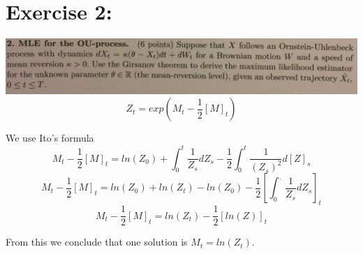 \documentclass[document.tex]{subfiles}
\begin{document}
\section*{Exercise 2:}


\includegraphics[width=\textwidth]{ex2.png}
\begin{equation}
Z_t = exp(M_t - \frac{1}{2} [M]_t)
\end{equation}

We use Ito's formula
\begin{equation}
M_t - \frac{1}{2} [M]_t = ln(Z_0) + \int_0^t \frac{1}{Z_s} d Z_s - \frac{1}{2} \int_0^t \frac{1}{(Z_s)^2} d [Z]_s
\end{equation}
\begin{equation}
M_t - \frac{1}{2} [M]_t = ln(Z_0) + ln(Z_t) - ln(Z_0) - \frac{1}{2} [\int_0^. \frac{1}{Z_s} d Z_s]_t
\end{equation}
\begin{equation}
M_t - \frac{1}{2} [M]_t = ln(Z_t) - \frac{1}{2} [ln(Z)]_t
\end{equation}

From this we conclude that one solution is $M_t = ln(Z_t)$.
\end{document}
